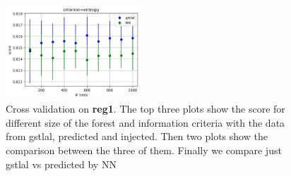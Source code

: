 \documentclass[prd,aps,twocolumn,a4paper,showkeys,nofootinbib]{revtex4-2}
\begin{document}
\begin{figure}[]
\includegraphics[width=0.45\textwidth]{./FigsClass/reg1_cv_2comparisonent}
\caption{\label{fig:cv_reg1} Cross validation on \textbf{reg1}. The top three plots show the score for different size of the forest and information criteria with the data from gstlal, predicted and injected. Then two plots show the comparison between the three of them. Finally we compare just gstlal vs predicted by NN}
\end{figure}



\end{document}
